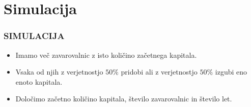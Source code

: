 \documentclass{beamer}
\begin{document}
\section{Simulacija}
\begin{frame}
	\frametitle{SIMULACIJA}
	\begin{itemize}
		\item Imamo več zavarovalnic z isto količino začetnega kapitala.
		\item Vsaka od njih z verjetnostjo $50 \%$ pridobi ali z verjetnostjo $50 \%$ izgubi eno enoto kapitala.
		\item Določimo začetno količino kapitala, število zavarovalnic in število let.
	\end{itemize}
\end{frame}
\end{document}
